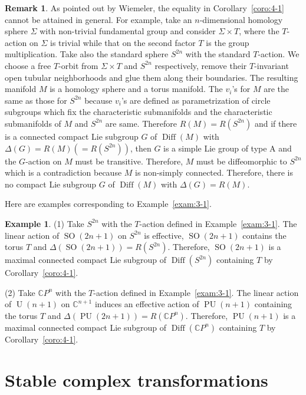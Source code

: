\documentclass[12pt]{amsart}
\theoremstyle{plain} \numberwithin{equation}{section}
\theoremstyle{definition}
\newtheorem{exam}[theo]{Example}
\newtheorem{rema}[theo]{Remark}
\def\C{\mathbb C}
\def\RG{\Delta(G)}
\DeclareMathOperator{\Diff}{Diff}
\DeclareMathOperator{\U}{U}
\DeclareMathOperator{\PU}{PU}
\DeclareMathOperator{\SO}{SO}
\begin{document}
\begin{rema}
As pointed out by Wiemeler, the equality in Corollary~\ref{coro:4-1} cannot be attained in general.  For example, take an $n$-dimensional homology sphere $\Sigma$ with non-trivial fundamental group and consider $\Sigma\times T$, where the $T$-action on $\Sigma$ is trivial while that on the second factor $T$ is the group multiplication.  Take also the standard sphere $S^{2n}$ with the standard $T$-action.  We choose a free $T$-orbit from $\Sigma\times T$ and $S^{2n}$ respectively, remove their $T$-invariant open tubular neighborhoods and glue them  along their boundaries.  The resulting manifold $M$ is a homology sphere and a torus manifold.  The $v_i$'s for $M$ are the same as those for $S^{2n}$ because $v_i$'s are defined as parametrization of circle subgroups which fix the characteristic submanifolds and the characteristic submanifolds of $M$ and $S^{2n}$ are same.  Therefore $R(M)=R(S^{2n})$ and if there is a connected compact Lie subgroup $G$ of $\Diff(M)$ with $\RG=R(M)(=R(S^{2n}))$, then $G$ is a simple Lie group of type A and the $G$-action on $M$ must be transitive.  Therefore, $M$ must be diffeomorphic to $S^{2n}$ which is a contradiction because $M$ is non-simply connected.  Therefore, there is no compact Lie subgroup $G$ of $\Diff(M)$ with $\RG=R(M)$.  
\end{rema}

Here are examples corresponding to Example~\ref{exam:3-1}.

\begin{exam} \label{exam:4-1}
(1) Take $S^{2n}$ with the $T$-action defined in Example~\ref{exam:3-1}.  The linear action of $\SO(2n+1)$ on $S^{2n}$ is effective, $\SO(2n+1)$ contains the torus $T$ and $\Delta(\SO(2n+1))=R(S^{2n})$.  Therefore, $\SO(2n+1)$ is a maximal connected compact Lie subgroup of $\Diff(S^{2n})$ containing $T$ by Corollary~\ref{coro:4-1}.

(2) Take $\C P^{n}$ with the $T$-action defined in Example~\ref{exam:3-1}.  The linear action of $\U(n+1)$ on $\C^{n+1}$ induces an effective action of  $\PU(n+1)$ containing the torus $T$ and $\Delta(\PU(2n+1))=R(\C P^{n})$.  Therefore, $\PU(n+1)$ is a maximal connected compact Lie subgroup of $\Diff(\C P^{n})$ containing $T$ by Corollary~\ref{coro:4-1}.
\end{exam}




\section{Stable complex transformations} \label{sect:5}
\end{document}
